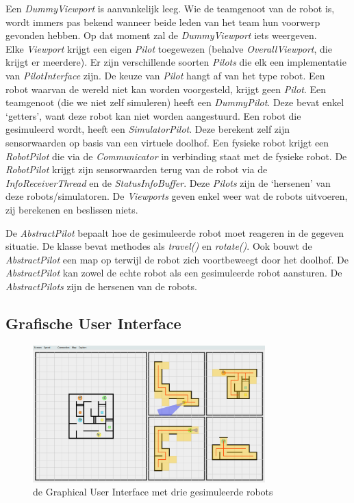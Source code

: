 \documentclass[tt2]{penoverslag}
\begin{document}
Een \textit{DummyViewport} is aanvankelijk leeg. Wie de teamgenoot van de robot is, wordt immers pas bekend wanneer beide leden van het team hun voorwerp gevonden hebben. Op dat moment zal de \textit{DummyViewport} iets weergeven.\\

Elke \textit{Viewport} krijgt een eigen \textit{Pilot} toegewezen (behalve \textit{OverallViewport}, die krijgt er meerdere). Er zijn verschillende soorten \textit{Pilots} die elk een implementatie van \textit{PilotInterface} zijn. De keuze van \textit{Pilot} hangt af van het type robot. Een robot waarvan de wereld niet kan worden voorgesteld, krijgt geen \textit{Pilot}. Een teamgenoot (die we niet zelf simuleren) heeft een \textit{DummyPilot}. Deze bevat enkel `getters', want deze robot kan niet worden aangestuurd. Een robot die gesimuleerd wordt, heeft een \textit{SimulatorPilot}. Deze berekent zelf zijn sensorwaarden op basis van een virtuele doolhof. Een fysieke robot krijgt een \textit{RobotPilot} die via de \textit{Communicator} in verbinding staat met de fysieke robot. De \textit{RobotPilot} krijgt zijn sensorwaarden terug van de robot via de \textit{InfoReceiverThread} en de \textit{StatusInfoBuffer}. Deze \textit{Pilots} zijn de `hersenen' van deze robots/simulatoren. De \textit{Viewports} geven enkel weer wat de robots uitvoeren, zij berekenen en beslissen niets.

De \textit{AbstractPilot} bepaalt hoe de gesimuleerde robot moet reageren in de gegeven situatie. De klasse bevat methodes als \textit{travel()} en \textit{rotate()}. Ook bouwt de \textit{AbstractPilot} een map op terwijl de robot zich voortbeweegt door het doolhof. De \textit{AbstractPilot} kan zowel de echte robot als een gesimuleerde robot aansturen. De \textit{AbstractPilots} zijn de hersenen van de robots.

\subsection{Grafische User Interface}
\label{ssec:GUI}

\begin{figure}[h]
\centering
	\includegraphics[width=0.8\textwidth]{GUI1}
\caption{de Graphical User Interface met drie gesimuleerde robots}
\label{fig:GUI1}
\end{figure}
\end{document}
